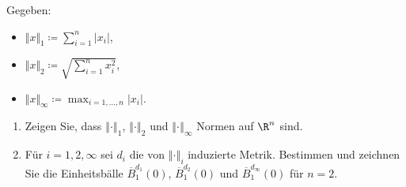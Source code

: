 \newpage
\begin{assignment}
  Gegeben:
  \begin{itemize}
    \item \( \Vert x \Vert_1 \coloneqq \sum_{i = 1}^n \vert x_i \vert \),
    \item \( \Vert x \Vert_2 \coloneqq \sqrt{\sum_{i=1}^n x_i^2} \),
    \item \( \Vert x \Vert_\infty \coloneqq \max_{i = 1,\dots,n} \vert x_i \vert \).
  \end{itemize}
  \begin{enumerate}[label= (\alph*)]
    \item Zeigen Sie, dass \( \left \Vert \cdot \right \Vert_1 \), \( \left \Vert \cdot \right \Vert_2 \) und \( \left \Vert \cdot \right \Vert_\infty \) Normen auf \( \R^n \) sind.
    
    \item Für \( i = 1,2,\infty \) sei \( d_i \) die von \( \left \Vert \cdot \right \Vert_i \) induzierte Metrik. Bestimmen und zeichnen Sie die Einheitsbälle \( \overline{B}_1^{d_1}(0) \), \( \overline{B}_1^{d_2}(0) \) und \( \overline{B}_1^{d_\infty}(0) \) für \( n = 2 \).
  \end{enumerate}
\end{assignment}
